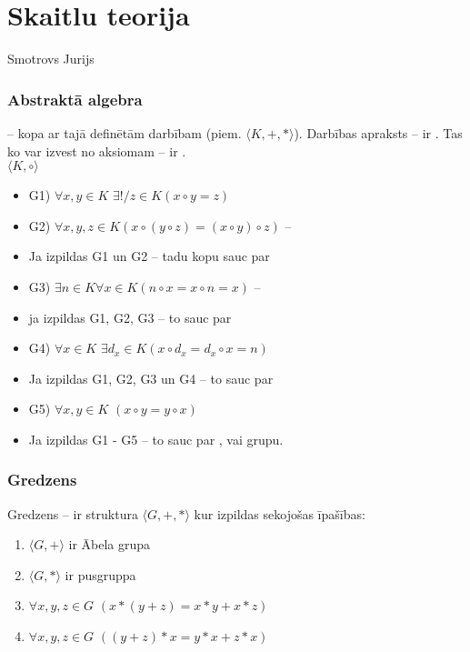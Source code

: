 \section{Skaitlu teorija}
Smotrovs Jurijs \\

\subsubsection{Abstraktā algebra}
 -- kopa ar tajā definētām darbībam (piem. $\langle K, +, * \rangle$).
Darbības apraksts -- ir . Tas ko var izvest no aksiomam -- ir . \\

$\langle K, \circ \rangle$
\begin{itemize}
  \item G1)  $\forall x,y \in K$ $\exists! / z \in K (x \circ y = z)$
  \item G2) $\forall x, y, z \in K (x \circ (y \circ z) = (x \circ y) \circ z)$ -- 
  \item Ja izpildas G1 un G2 -- tadu kopu sauc par 
  \item G3) $\exists n \in K \forall x \in K (n \circ x = x \circ n = x)$ -- 
  \item ja izpildas G1, G2, G3 -- to sauc par 
  \item G4) $\forall x \in K$  $\exists d_x \in K (x \circ d_x = d_x \circ x = n)$
  \item Ja izpildas G1, G2, G3 un G4 -- to sauc par 
  \item G5) $\forall x, y \in K $ $(x \circ y = y \circ x)$ 
  \item Ja izpildas G1 - G5 -- to sauc par , vai  grupu.
\end{itemize}

\subsubsection{Gredzens}
Gredzens -- ir struktura $\langle G, +, * \rangle$ kur izpildas sekojošas īpašības:
\begin{enumerate}
  \item $\langle G, + \rangle$ ir Ābela grupa
  \item $\langle G, * \rangle$ ir pusgruppa
  \item $\forall x,y, z \in G $ $(x * (y + z) = x * y + x * z)$
  \item $\forall x, y, z \in G$ $( (y + z) * x = y * x + z * x)$
\end{enumerate}
